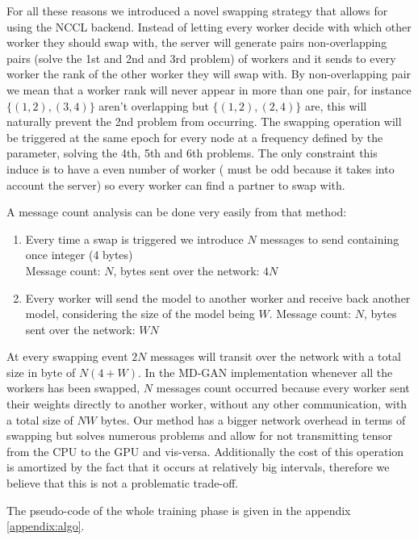 For all these reasons we introduced a novel swapping strategy that allows for using the NCCL backend. Instead of letting every worker decide with which other worker they should swap with, the server will generate pairs non-overlapping pairs (solve the 1st and 2nd and 3rd problem) of workers and it sends to every worker the rank of the other worker they will swap with. By non-overlapping pair we mean that a worker rank will never appear in more than one pair, for instance $\{(1, 2), (3, 4)\}$ aren't overlapping but $\{(1, 2), (2, 4)\}$ are, this will naturally prevent the 2nd problem from occurring. The swapping operation will be triggered at the same epoch for every node at a frequency defined by the  parameter, solving the 4th, 5th and 6th problems. The only constraint this induce is to have a even number of worker ( must be odd because it takes into account the server) so every worker can find a partner to swap with.

A message count analysis can be done very easily from that method:
\begin{enumerate}
    \item Every time a swap is triggered we introduce $N$ messages to send containing once integer (4 bytes)\\
    Message count: $N$, bytes sent over the network: $4N$
    \item Every worker will send the model to another worker and receive back another model, considering the size of the model being $W$.
    Message count: $N$, bytes sent over the network: $WN$
\end{enumerate}
At every swapping event $2N$ messages will transit over the network with a total size in byte of $N(4+W)$. In the MD-GAN implementation whenever all the workers has been swapped, $N$ messages count occurred because every worker sent their weights directly to another worker, without any other communication, with a total size of $NW$ bytes. Our method has a bigger network overhead in terms of swapping but solves numerous problems and allow for not transmitting tensor from the CPU to the GPU and vis-versa. Additionally the cost of this operation is amortized by the fact that it occurs at relatively big intervals, therefore we believe that this is not a problematic trade-off.

The pseudo-code of the whole training phase is given in the appendix \ref{appendix:algo}.

